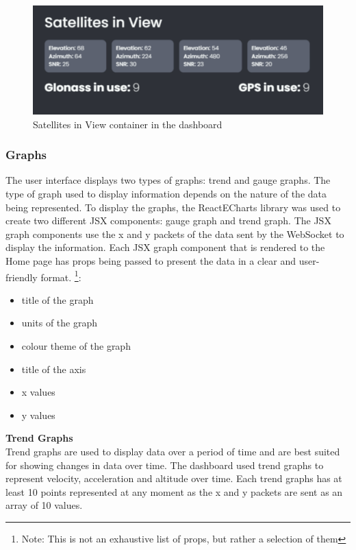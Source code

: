 \begin{figure}[H]
    \includegraphics [scale=0.5] {ui_satellites_in_view}
    \centering
     {Satellites in View container in the dashboard}
\end{figure}

\subsubsection{Graphs}
The user interface displays two types of graphs: trend and gauge graphs. 
The type of graph used to display information depends on the nature of the data being represented. 
To display the graphs, the ReactECharts library was used to create two different JSX components: 
gauge graph and trend graph. The JSX graph components use the x and y packets of the data sent by the 
WebSocket to display the information. Each JSX graph component that is rendered to the Home page has 
props being passed to present the data in a clear and user-friendly format.
\footnote{Note: This is not an exhaustive list 
of props, but rather a selection of them}: 

\begin{multicols}{2}
    \begin{itemize} 
        \item title of the graph    
        \item units of the graph       
        \item colour theme of the graph
        \item title of the axis
        \item x values          
        \item y values
    \end{itemize}
\end{multicols}



\textbf{Trend Graphs}
\\Trend graphs are used to display data over a period of time and 
are best suited for showing changes in data over time. The dashboard used trend graphs
to represent velocity, acceleration and altitude over time. Each trend graphs has 
at least 10 points represented at any moment as the x and y packets are sent as an array of 10 values.

